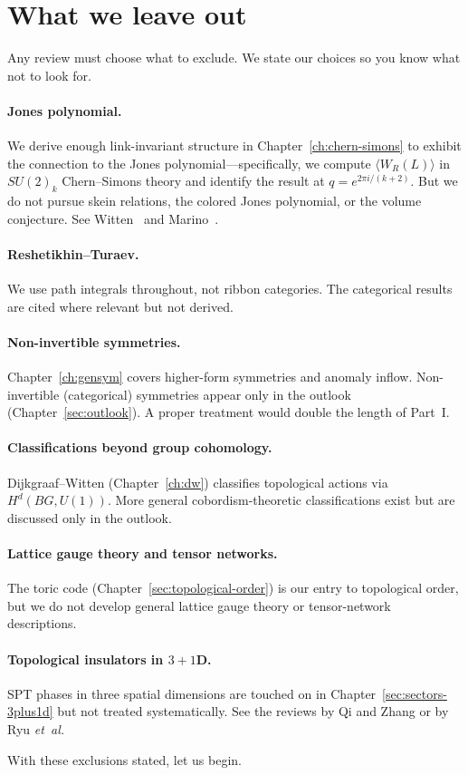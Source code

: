 \section{What we leave out}\label{sec:noncoverage}

Any review must choose what to exclude.  We state our choices so you know what not to look for.

\paragraph{Jones polynomial.}
We derive enough link-invariant structure in Chapter~\ref{ch:chern-simons} to exhibit the connection to the Jones polynomial---specifically, we compute $\langle W_R(L)\rangle$ in $SU(2)_k$ Chern--Simons theory and identify the result at $q = e^{2\pi i/(k+2)}$.  But we do not pursue skein relations, the colored Jones polynomial, or the volume conjecture.  See Witten~\cite{Witten1989Jones} and Marino~\cite{Marino2005}.

\paragraph{Reshetikhin--Turaev.}
We use path integrals throughout, not ribbon categories.  The categorical results are cited where relevant but not derived.

\paragraph{Non-invertible symmetries.}
Chapter~\ref{ch:gensym} covers higher-form symmetries and anomaly inflow.  Non-invertible (categorical) symmetries appear only in the outlook (Chapter~\ref{sec:outlook}).  A proper treatment would double the length of Part~I.

\paragraph{Classifications beyond group cohomology.}
Dijkgraaf--Witten (Chapter~\ref{ch:dw}) classifies topological actions via $H^d(BG, U(1))$.  More general cobordism-theoretic classifications exist but are discussed only in the outlook.

\paragraph{Lattice gauge theory and tensor networks.}
The toric code (Chapter~\ref{sec:topological-order}) is our entry to topological order, but we do not develop general lattice gauge theory or tensor-network descriptions.

\paragraph{Topological insulators in $3{+}1$D.}
SPT phases in three spatial dimensions are touched on in Chapter~\ref{sec:sectors-3plus1d} but not treated systematically.  See the reviews by Qi and Zhang or by Ryu \emph{et~al.}

\medskip

\noindent With these exclusions stated, let us begin.

